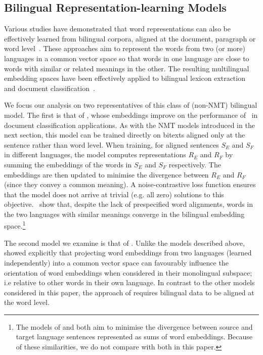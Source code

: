 \documentclass{article} %
\begin{document}
\subsection{Bilingual Representation-learning Models}
Various studies have demonstrated that word representations can also be effectively learned from bilingual corpora, aligned at the document, paragraph or word level~\citep{haghighi2008learning,vulic2011identifying,mikolov2013exploiting,Hermann:2014:ICLR,Chandar}. These approaches aim to represent the words from two (or more) languages in a common vector space so that words in one language are close to words with similar or related meanings in the other. The resulting multilingual embedding spaces have been effectively applied to bilingual lexicon extraction~\citep{haghighi2008learning,vulic2011identifying,mikolov2013exploiting} and document classification~\citep{klementiev2012inducing,Hermann:2014:ICLR,Chandar,Kocisky:2014}.

We focus our analysis on two representatives of this class of (non-NMT) bilingual model. The first is that of \cite{Hermann:2014:ICLR}, whose embeddings improve on the performance of~\cite{Klementiev} in document classification applications. As with the NMT models introduced in the next section, this model can be trained directly on bitexts aligned only at the sentence rather than word level. When training, for aligned sentences \(S_E\) and \(S_F\) in different languages, the model computes representations \(R_E\) and \(R_F\) by summing the embeddings of the words in \(S_E\) and \(S_F\) respectively. The embeddings are then updated to minimise the divergence between \(R_E\) and \(R_F\) (since they convey a common meaning). A noise-contrastive loss function ensures that the model does not arrive at trivial (e.g. all zero) solutions to this objective.~\cite{Hermann:2014:ICLR} show that, despite the lack of prespecified word alignments, words in the two languages with similar meanings converge in the bilingual embedding space.\footnote{The models of \cite{Chandar} and \cite{Hermann:2014:ICLR} both aim to minimise the divergence between source and target language sentences represented as sums of word embeddings. Because of these similarities, we do not compare with both in this paper.}

The second model we examine is that of \cite{faruqui2014improving}. Unlike the models described above, \cite{faruqui2014improving} showed explicitly that projecting word embeddings from two languages (learned independently) into a common vector space can favourably influence the orientation of word embeddings when considered in their monolingual subspace; i.e relative to other words in their own language.  In contrast to the other models considered in this paper, the approach of \cite{faruqui2014improving} requires bilingual data to be aligned at the word level.
\end{document}
